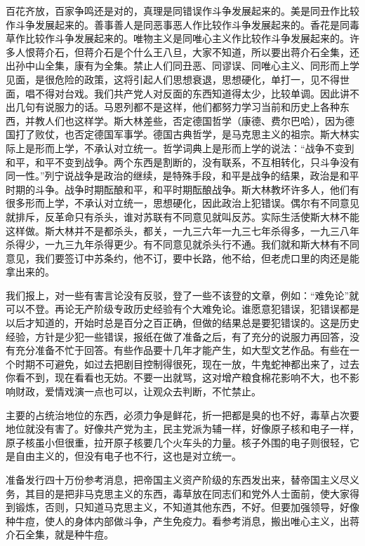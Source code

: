 百花齐放，百家争鸣还是对的，真理是同错误作斗争发展起来的。美是同丑作比较作斗争发展起来的。善事善人是同恶事恶人作比较作斗争发展起来的。香花是同毒草作比较作斗争发展起来的。唯物主义是同唯心主义作比较作斗争发展起来的。许多人恨蒋介石，但蒋介石是个什么王八旦，大家不知道，所以要出蒋介石全集，还出孙中山全集，康有为全集。禁止人们同丑恶、同谬误、同唯心主义、同形而上学见面，是很危险的政策，这将引起人们思想衰退，思想硬化，单打一，见不得世面，唱不得对台戏。我们共产党人对反面的东西知道得太少，比较单调。因此讲不出几句有说服力的话。马恩列都不是这样，他们都努力学习当前和历史上各种东西，并教人们也这样学。斯大林差些，否定德国哲学（康德、费尔巴哈），因为德国打了败仗，也否定德国军事学。德国古典哲学，是马克思主义的祖宗。斯大林实际上是形而上学，不承认对立统一。哲学词典上是形而上学的说法：“战争不变到和平，和平不变到战争。两个东西是割断的，没有联系，不互相转化，只斗争没有同一性。”列宁说战争是政治的继续，是特殊手段，和平是战争的结果，政治是和平时期的斗争。战争时期酝酿和平，和平时期酝酿战争。斯大林教坏许多人，他们有很多形而上学，不承认对立统一，思想硬化，因此政治上犯错误。偶尔有不同意见就排斥，反革命只有杀头，谁对苏联有不同意见就叫反苏。实际生活使斯大林不能这样做。斯大林并不是都杀头，都关，一九三六年一九三七年杀得多，一九三八年杀得少，一九三九年杀得更少。有不同意见就杀头行不通。我们就和斯大林有不同意见，我们要签订中苏条约，他不订，要中长路，他不给，但老虎口里的肉还是能拿出来的。

我们报上，对一些有害言论没有反驳，登了一些不该登的文章，例如：“难免论”就可以不登。再论无产阶级专政历史经验有个大难免论。谁愿意犯错误，犯错误都是以后才知道的，开始时总是百分之百正确，但做的结果总是要犯错误的。这是历史经验，方针是少犯一些错误，报纸在做了准备之后，有了充分的说服力再回答，没有充分准备不忙于回答。有些作品要十几年才能产生，如大型文艺作品。有些在一个时期不可避免，如过去把剧目控制得很死，现在一放，牛鬼蛇神都出来了，过去你看不到，现在看看也无妨。不要一出就骂，这对增产粮食棉花影响不大，也不影响财政，爱情戏演一点也可以，让观众去判断，不忙禁止。

主要的占统治地位的东西，必须力争是鲜花，折一把都是臭的也不好，毒草占次要地位就没有害了。好像共产党为主，民主党派为辅一样，好像原子核和电子一样，原子核虽小但很重，拉开原子核要几个火车头的力量。核子外围的电子则很轻，它是自由主义的，但没有电子也不行，这也是对立统一。

准备发行四十万份参考消息，把帝国主义资产阶级的东西发出来，替帝国主义尽义务，其目的是把非马克思主义的东西，毒草放在同志们和党外人士面前，使大家得到锻炼，否则，只知道马克思主义，不知道其他东西，不好。但要加强领导，好像种牛痘，使人的身体内部做斗争，产生免疫力。看参考消息，搬出唯心主义，出蒋介石全集，就是种牛痘。

